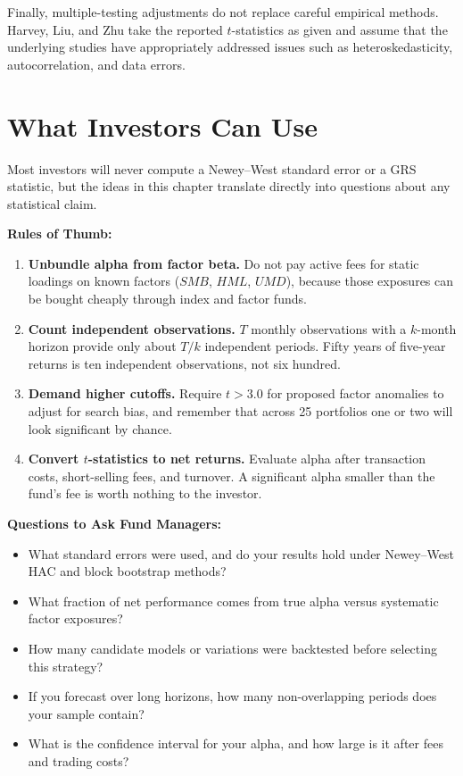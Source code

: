 Finally, multiple-testing adjustments do not replace
careful empirical methods. Harvey, Liu, and Zhu take the
reported $t$-statistics as given and assume that the
underlying studies have appropriately addressed issues
such as heteroskedasticity, autocorrelation, and data
errors. 

\section{What Investors Can Use}
\label{sec:03-investors}

Most investors will never compute a Newey--West standard error or a GRS statistic, but the ideas in this chapter translate directly into questions about any statistical claim.

\textbf{Rules of Thumb:}
\begin{enumerate}
  \item \textbf{Unbundle alpha from factor beta.} Do not pay active fees for static loadings on known factors ($SMB$, $HML$, $UMD$), because those exposures can be bought cheaply through index and factor funds.
  \item \textbf{Count independent observations.} $T$ monthly observations with a $k$-month horizon provide only about $T/k$ independent periods. Fifty years of five-year returns is ten independent observations, not six hundred.
  \item \textbf{Demand higher cutoffs.} Require $t > 3.0$ for proposed factor anomalies to adjust for search bias, and remember that across 25 portfolios one or two will look significant by chance.
  \item \textbf{Convert $t$-statistics to net returns.} Evaluate alpha after transaction costs, short-selling fees, and turnover. A significant alpha smaller than the fund's fee is worth nothing to the investor.
\end{enumerate}

\textbf{Questions to Ask Fund Managers:}
\begin{itemize}
  \item What standard errors were used, and do your results hold under Newey--West HAC and block bootstrap methods?
  \item What fraction of net performance comes from true alpha versus systematic factor exposures?
  \item How many candidate models or variations were backtested before selecting this strategy?
  \item If you forecast over long horizons, how many non-overlapping periods does your sample contain?
  \item What is the confidence interval for your alpha, and how large is it after fees and trading costs?
\end{itemize}

